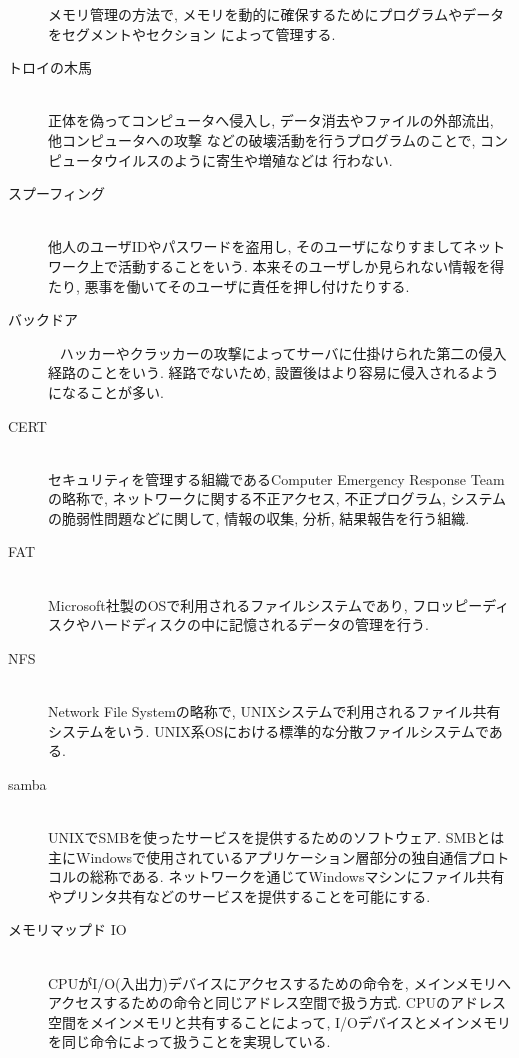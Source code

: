 \documentclass[a4paper, twocolumn]{jarticle}
\begin{document}
\begin{description}
    メモリ管理の方法で, メモリを動的に確保するためにプログラムやデータをセグメントやセクション
    によって管理する. \cite{ref:seg}
  \item[トロイの木馬]\mbox{ }\\
    正体を偽ってコンピュータへ侵入し, データ消去やファイルの外部流出, 他コンピュータへの攻撃
    などの破壊活動を行うプログラムのことで, コンピュータウイルスのように寄生や増殖などは
    行わない. \cite{ref:trojan}
  \item[スプーフィング]\mbox{ }\\
    他人のユーザIDやパスワードを盗用し, そのユーザになりすましてネットワーク上で活動することをいう. 
    本来そのユーザしか見られない情報を得たり, 悪事を働いてそのユーザに責任を押し付けたりする. 
    \cite{ref:spoofing}
  \item[バックドア]\mbox{ }
    ハッカーやクラッカーの攻撃によってサーバに仕掛けられた第二の侵入経路のことをいう. 
    経路でないため, 設置後はより容易に侵入されるようになることが多い. 
    \cite{ref:backdoor}
  \item[CERT]\mbox{ }\\
    セキュリティを管理する組織であるComputer Emergency Response Teamの略称で, 
    ネットワークに関する不正アクセス, 不正プログラム, システムの脆弱性問題などに関して, 
    情報の収集, 分析, 結果報告を行う組織. \cite{ref:cert}
  \item[FAT]\mbox{}\\
    Microsoft社製のOSで利用されるファイルシステムであり, フロッピーディスクやハードディスクの中に記憶されるデータの管理を行う. 
    \cite{ref:fat}
  \item[NFS]\mbox{ }\\
    Network File Systemの略称で, UNIXシステムで利用されるファイル共有システムをいう. 
    UNIX系OSにおける標準的な分散ファイルシステムである. \cite{ref:nfs}
  \item[samba]\mbox{ }\\
    UNIXでSMBを使ったサービスを提供するためのソフトウェア. 
    SMBとは主にWindowsで使用されているアプリケーション層部分の独自通信プロトコルの総称である. 
    ネットワークを通じてWindowsマシンにファイル共有やプリンタ共有などのサービスを提供することを可能にする.
    \cite{ref:samba}\cite{ref:smb}
  \item[メモリマップド IO]\mbox{ }\\
    CPUがI/O(入出力)デバイスにアクセスするための命令を, 
    メインメモリへアクセスするための命令と同じアドレス空間で扱う方式. 
    CPUのアドレス空間をメインメモリと共有することによって, 
    I/Oデバイスとメインメモリを同じ命令によって扱うことを実現している. 

\end{description}
\end{document}
